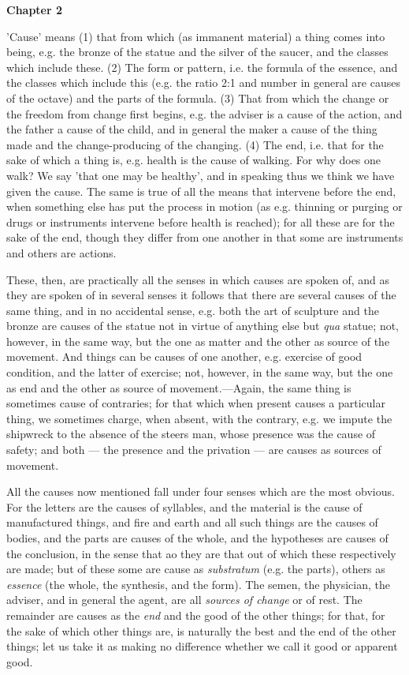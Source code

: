 \textbf{Chapter 2}

'Cause' means (1) that from which (as immanent material) a thing comes into being, e.g. the bronze of the statue and the silver of the saucer, and the classes which include these. (2) The form or pattern, i.e. the formula of the essence, and the classes which include this (e.g. the ratio 2:1 and number in general are causes of the octave) and the parts of the formula. (3) That from which the change or the freedom from change first begins, e.g. the adviser is a cause of the action, and the father a cause of the child, and in general the maker a cause of the thing made and the change-producing of the changing. (4) The end, i.e. that for the sake of which a thing is, e.g. health is the cause of walking. For why does one walk? We say 'that one may be healthy', and in speaking thus we think we have given the cause. The same is true of all the means that intervene before the end, when something else has put the process in motion (as e.g. thinning or purging or drugs or instruments intervene before health is reached); for all these are for the sake of the end, though they differ from one another in that some are instruments and others are actions.

These, then, are practically all the senses in which causes are spoken of, and as they are spoken of in several senses it follows that there are several causes of the same thing, and in no accidental sense, e.g. both the art of sculpture and the bronze are causes of the statue not in virtue of anything else but \emph{qua} statue; not, however, in the same way, but the one as matter and the other as source of the movement. And things can be causes of one another, e.g. exercise of good condition, and the latter of exercise; not, however, in the same way, but the one as end and the other as source of movement.—Again, the same thing is sometimes cause of contraries; for that which when present causes a particular thing, we sometimes charge, when absent, with the contrary, e.g. we impute the shipwreck to the absence of the steers man, whose presence was the cause of safety; and both — the presence and the privation — are causes as sources of movement.

All the causes now mentioned fall under four senses which are the most obvious. For the letters are the causes of syllables, and the material is the cause of manufactured things, and fire and earth and all such things are the causes of bodies, and the parts are causes of the whole, and the hypotheses are causes of the conclusion, in the sense that ao they are that out of which these respectively are made; but of these some are cause as \emph{substratum} (e.g. the parts), others as \emph{essence} (the whole, the synthesis, and the form). The semen, the physician, the adviser, and in general the agent, are all \emph{sources of change} or of rest. The remainder are causes as the \emph{end} and the good of the other things; for that, for the sake of which other things are, is naturally the best and the end of the other things; let us take it as making no difference whether we call it good or apparent good.

